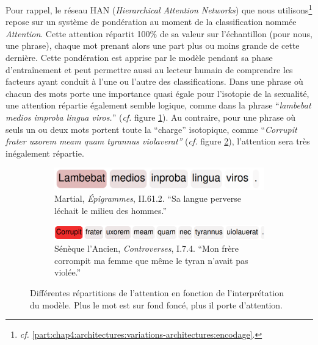 
Pour rappel, le réseau HAN (\textit{Hierarchical Attention Networks}) que nous utilisons\footnote{\textit{cf.} \ref{part:chap4:architectures:variations-architectures:encodage}.} repose sur un système de pondération au moment de la classification nommée \textit{Attention}. Cette attention répartit 100\% de sa valeur sur l'échantillon (pour nous, une phrase), chaque mot prenant alors une part plus ou moins grande de cette dernière. Cette pondération est apprise par le modèle pendant sa phase d'entraînement et peut permettre aussi au lecteur humain de comprendre les facteurs ayant conduit à l'une ou l'autre des classifications. Dans une phrase où chacun des mots porte une importance quasi égale pour l'isotopie de la sexualité, une attention répartie également semble logique, comme dans la phrase ``\textit{lambebat medios improba lingua viros.}'' (\textit{cf.} figure \ref{fig:chap4:attention:repartie}). Au contraire, pour une phrase où seuls un ou deux mots portent toute la ``charge'' isotopique, comme ``\textit{Corrupit frater uxorem meam quam tyrannus violaverat''} (\textit{cf.} figure \ref{fig:chap4:attention:mono}), l'attention sera très inégalement répartie.

\begin{figure}
     \centering
     \begin{subfigure}[t]{0.45\textwidth}
         \centering
         \includegraphics[width=\textwidth]{figures/chap4/attention.png}
         \caption{Martial, \textit{Épigrammes}, II.61.2. ``Sa langue perverse léchait le milieu des hommes.''}
         \label{fig:chap4:attention:repartie}
     \end{subfigure}
     \hfill
     \begin{subfigure}[t]{0.45\textwidth}
         \centering
         \includegraphics[width=\textwidth]{figures/chap4/attention2.png}
         \caption{Sénèque l'Ancien, \textit{Controverses}, I.7.4. ``Mon frère corrompit ma femme que même le tyran n'avait pas violée.''}
         \label{fig:chap4:attention:mono}
     \end{subfigure}
    \caption{Différentes répartitions de l'attention en fonction de l'interprétation du modèle. Plus le mot est sur fond foncé, plus il porte d'attention.}
    \label{fig:chap4:attention}
\end{figure}


